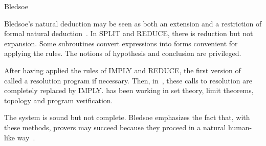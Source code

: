 \begin{entry}{Bledsoe}
\begin{clarifications}
Bledsoe's natural deduction may be seen as both an extension and 
a restriction of formal natural deduction~. 
In SPLIT and REDUCE, there is reduction but not expansion. 
Some subroutines convert expressions into forms convenient 
for applying the rules. 
The notions of hypothesis and conclusion are privileged.
\end{clarifications}

\begin{history}
After having applied the rules of IMPLY and REDUCE, the first version of
{\sc \Bledsoe}~\cite{bledsoe:1971} called a resolution program if necessary. 
Then, in~\cite{bledsoe:1972}, these calls to resolution are completely 
replaced by IMPLY. 
\Bledsoe has been working in set theory, limit theorems, topology and 
program verification.
\end{history}

\begin{technicalities}
The system is sound but not complete.
Bledsoe emphasizes the fact that, with these methods, provers may succeed 
because they proceed in a natural human-like way~\cite{bledsoe:1977}.
\end{technicalities}



\end{entry}

